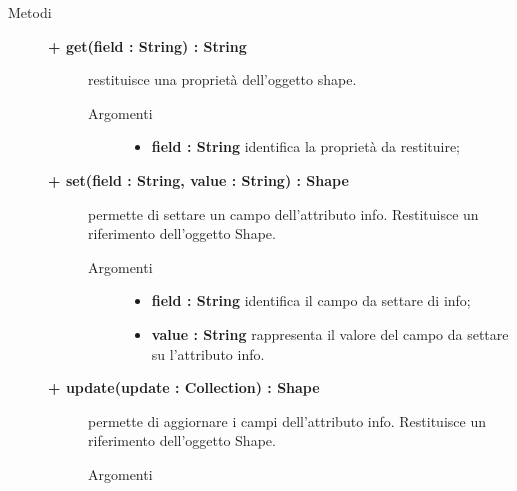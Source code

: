 \begin{description}
\item[Metodi] \hfill

\begin{description}
		\item[\textbf{\color{blue}+ get(field : String) : String			}] \hfill
			restituisce una proprietà dell'oggetto shape.
			
		\begin{description}
			\item[Argomenti] \hfill
				\begin{itemize}
				
					\item \textbf{field : String			} \hfill
					identifica la proprietà da restituire;
				\end{itemize}
		\end{description}

\end{description}


		\begin{description}
		\item[\textbf{\color{blue}+ set(field : String, value : String) : Shape			}] \hfill
			permette di settare un campo dell'attributo info. Restituisce un riferimento dell'oggetto Shape.
			
		\begin{description}
			\item[Argomenti] \hfill
				\begin{itemize}
				
					\item \textbf{field : String			} \hfill
					identifica il campo da settare di info;
					\item \textbf{value : String			} \hfill
					rappresenta il valore del campo da settare su l'attributo info.
				\end{itemize}
		\end{description}

\end{description}

\begin{description}
		\item[\textbf{\color{blue}+ update(update : Collection) : Shape			}] \hfill
			permette di aggiornare i campi dell'attributo info. Restituisce un riferimento dell'oggetto Shape.
			
		\begin{description}
			\item[Argomenti] \hfill
				\begin{itemize}
				

\end{itemize}
\end{description}
\end{description}
\end{description}
